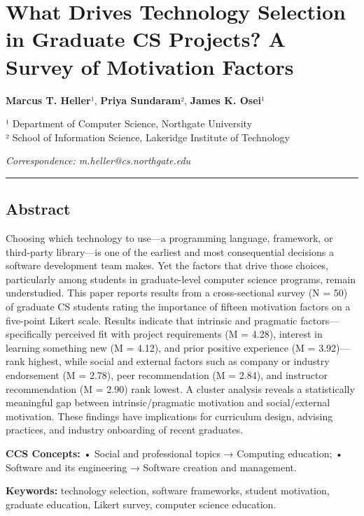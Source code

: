 \documentclass[
]{article}
\author{}
\date{}
\begin{document}
\section{What Drives Technology Selection in Graduate CS Projects? A
Survey of Motivation
Factors}\label{what-drives-technology-selection-in-graduate-cs-projects-a-survey-of-motivation-factors}

\textbf{Marcus T. Heller}¹, \textbf{Priya Sundaram}², \textbf{James K.
Osei}¹

¹ Department of Computer Science, Northgate University\\
² School of Information Science, Lakeridge Institute of Technology

\emph{Correspondence: m.heller@cs.northgate.edu}

\begin{center}\rule{0.5\linewidth}{0.5pt}\end{center}

\subsection{Abstract}\label{abstract}

Choosing which technology to use---a programming language, framework, or
third-party library---is one of the earliest and most consequential
decisions a software development team makes. Yet the factors that drive
those choices, particularly among students in graduate-level computer
science programs, remain understudied. This paper reports results from a
cross-sectional survey (N = 50) of graduate CS students rating the
importance of fifteen motivation factors on a five-point Likert scale.
Results indicate that intrinsic and pragmatic factors---specifically
perceived fit with project requirements (M = 4.28), interest in learning
something new (M = 4.12), and prior positive experience (M =
3.92)---rank highest, while social and external factors such as company
or industry endorsement (M = 2.78), peer recommendation (M = 2.84), and
instructor recommendation (M = 2.90) rank lowest. A cluster analysis
reveals a statistically meaningful gap between intrinsic/pragmatic
motivation and social/external motivation. These findings have
implications for curriculum design, advising practices, and industry
onboarding of recent graduates.

\textbf{CCS Concepts:} • Social and professional topics → Computing
education; • Software and its engineering → Software creation and
management.

\textbf{Keywords:} technology selection, software frameworks, student
motivation, graduate education, Likert survey, computer science
education.
\end{document}
